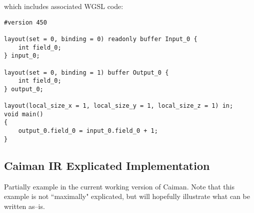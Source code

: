 which includes associated WGSL code:

\begin{lstlisting}
#version 450

layout(set = 0, binding = 0) readonly buffer Input_0 {
    int field_0;
} input_0;

layout(set = 0, binding = 1) buffer Output_0 {
    int field_0;
} output_0;

layout(local_size_x = 1, local_size_y = 1, local_size_z = 1) in;
void main()
{
    output_0.field_0 = input_0.field_0 + 1;
}
\end{lstlisting}

\subsection{Caiman IR Explicated Implementation}
\label{subsec:worked-explicated-example}
Partially example in the current working version of Caiman.  Note that this example is not ``maximally" explicated, but will hopefully illustrate what can be written as--is.

